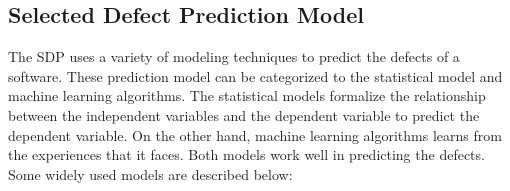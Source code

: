 \documentclass[12pt]{report}
\begin{document}
\subsection{Selected Defect Prediction Model}
\label{Ways_Of_the_Software_Defect_Prediction}
The SDP uses a variety of modeling techniques to predict the defects of a software. These prediction model can be categorized to the statistical model and machine learning algorithms. The statistical models formalize the relationship between the independent variables and the dependent variable to predict the dependent variable. On the other hand, machine learning algorithms learns from the experiences that it faces. Both models work well in predicting the defects. Some widely used models are described below:
%


\end{document}
